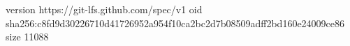 version https://git-lfs.github.com/spec/v1
oid sha256:c8fd9d30226710d41726952a954f10ca2bc2d7b08509adff2bd160e24009ce86
size 11088
